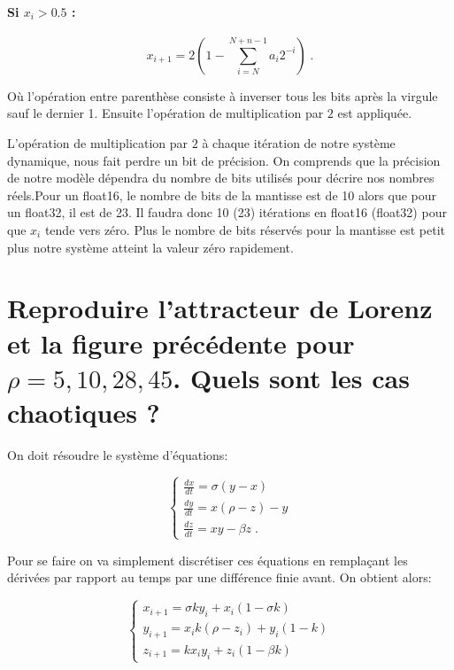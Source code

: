 \documentclass[a4paper, 12pt]{report}
\begin{document}
\paragraph{Si $x_i > 0.5$ :}

\begin{equation}
x_{i+1} = 2\left(1-\sum_{i=N}^{N+n-1} a_i 2^{-i}\right)\;.
\end{equation}

Où l'opération entre parenthèse consiste à inverser tous les bits après la virgule sauf le dernier 1. Ensuite l'opération de multiplication par $2$ est appliquée.

L'opération de multiplication par $2$ à chaque itération de notre système dynamique, nous fait perdre un bit de précision. On comprends que la précision de notre modèle dépendra du nombre de bits utilisés pour décrire nos nombres réels.Pour un float16, le nombre de bits de la mantisse est de 10 alors que pour un float32, il est de 23. Il faudra donc 10 (23) itérations  en float16 (float32) pour que $x_{i}$ tende vers zéro. Plus le nombre de bits réservés pour la mantisse est petit plus notre système atteint la valeur zéro rapidement.


\section{Reproduire l'attracteur de Lorenz et la figure précédente pour
$\rho = 5, 10, 28, 45$. Quels sont les cas chaotiques ?}

On doit résoudre le système d'équations:

\begin{equation}
\left \{
\begin{aligned}
    \frac{dx}{dt} = \sigma (y-x)\\
    \frac{dy}{dt} = x(\rho-z)-y\\
    \frac{dz}{dt} = xy-\beta z\;.
\end{aligned}
\right.
\end{equation}

Pour se faire on va simplement discrétiser ces équations en remplaçant
les dérivées par rapport au temps par une différence finie avant. On
obtient alors:

\begin{equation}
\left \{
\begin{aligned}
    x_{i+1} = \sigma k y_i + x_i (1- \sigma k)\\
    y_{i+1} = x_i k (\rho-z_i) + y_i (1-k)\\
    z_{i+1} = k x_i y_i + z_i (1-\beta k)
\end{aligned}
\right.
\end{equation}
\end{document}

